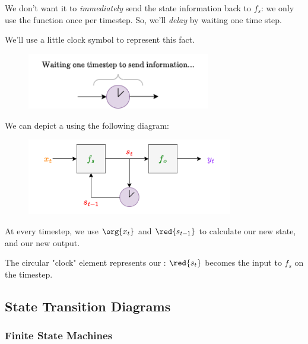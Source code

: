             We don't want it to \textit{immediately} send the state information back to $f_s$: we only use the function once per timestep. So, we'll \textit{delay} by waiting one time step.
            
            We'll use a little clock symbol to represent this fact.
            
            \begin{figure}[H]
                \centering
                \includegraphics[width=80mm,scale=0.4]{images/rnn_images/clock.png}
            \end{figure}
            
            \begin{notation}
                We can depict a  using the following diagram:
                
                \begin{figure}[H]
                    \centering
                    \includegraphics[width=90mm,scale=0.4]{images/rnn_images/state_machine_diagram.png}
                \end{figure}
                
                At every timestep, we use $\org{x_t}$ and $\red{s_{t-1}}$ to calculate our new state, and our new output.
                
                The circular "clock" element represents our : $\red{s_t}$ becomes the input to $f_s$ on the  timestep.
            \end{notation}
    
    \secdiv
    
    \subsection{State Transition Diagrams}
    
        \subsubsection{Finite State Machines}
    
